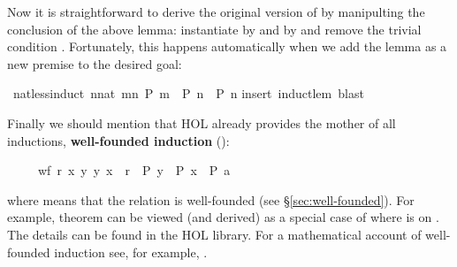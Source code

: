 \begin{isabellebody}
\begin{isamarkuptext}
Now it is straightforward to derive the original version of
 by manipulting the conclusion of the above lemma:
instantiate  by  and  by  and
remove the trivial condition . Fortunately, this
happens automatically when we add the lemma as a new premise to the
desired goal:%
\end{isamarkuptext}%
\ nat{\isacharunderscore}less{\isacharunderscore}induct{\isacharcolon}\ {\isachardoublequote}{\isacharparenleft}{\isasymAnd}n{\isacharcolon}{\isacharcolon}nat{\isachardot}\ {\isasymforall}m{\isacharless}n{\isachardot}\ P\ m\ {\isasymLongrightarrow}\ P\ n{\isacharparenright}\ {\isasymLongrightarrow}\ P\ n{\isachardoublequote}\isanewline
{}insert\ induct{\isacharunderscore}lem{\isacharcomma}\ blast{\isacharparenright}%
\begin{isamarkuptext}%
Finally we should mention that HOL already provides the mother of all
inductions, \textbf{well-founded
induction} ():
\begin{isabelle}%
\ \ \ \ \ {\isasymlbrakk}wf\ r{\isacharsemicolon}\ {\isasymAnd}x{\isachardot}\ {\isasymforall}y{\isachardot}\ {\isacharparenleft}y{\isacharcomma}\ x{\isacharparenright}\ {\isasymin}\ r\ {\isasymlongrightarrow}\ P\ y\ {\isasymLongrightarrow}\ P\ x{\isasymrbrakk}\ {\isasymLongrightarrow}\ P\ a%
\end{isabelle}
where  means that the relation  is well-founded
(see \S\ref{sec:well-founded}).
For example, theorem  can be viewed (and
derived) as a special case of  where 
 is \isa{{\isacharless}} on . The details can be found in the HOL library.
For a mathematical account of well-founded induction see, for example, \cite{Baader-Nipkow}.%
\end{isamarkuptext}%
\end{isabellebody}%
